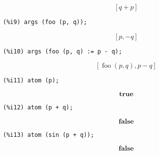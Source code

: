 \documentclass[12pt,leqno]{article}
\begin{document}
\begin{enumerate}
\begin{dmath}[number={\(\mathop{\mathrm{\%o}_{8}}\)}]
\left[q+p\right]
\end{dmath}
\begin{verbatim}
(%i9) args (foo (p, q));
\end{verbatim}
\begin{dmath}[number={\(\mathop{\mathrm{\%o}_{9}}\)}]
\left[p, -q\right]
\end{dmath}
\begin{verbatim}
(%i10) args (foo (p, q) := p - q);
\end{verbatim}
\begin{dmath}[number={\(\mathop{\mathrm{\%o}_{10}}\)}]
\left[\mathop{\mathrm{foo}}\left(p, q\right), p-q\right]
\end{dmath}
\begin{verbatim}
(%i11) atom (p);
\end{verbatim}
\begin{dmath}[number={\(\mathop{\mathrm{\%o}_{11}}\)}]
\mathop{\mathbf{true}}
\end{dmath}
\begin{verbatim}
(%i12) atom (p + q);
\end{verbatim}
\begin{dmath}[number={\(\mathop{\mathrm{\%o}_{12}}\)}]
\mathop{\mathbf{false}}
\end{dmath}
\begin{verbatim}
(%i13) atom (sin (p + q));
\end{verbatim}
\begin{dmath}[number={\(\mathop{\mathrm{\%o}_{13}}\)}]
\mathop{\mathbf{false}}
\end{dmath}



\end{enumerate}
\end{document}
